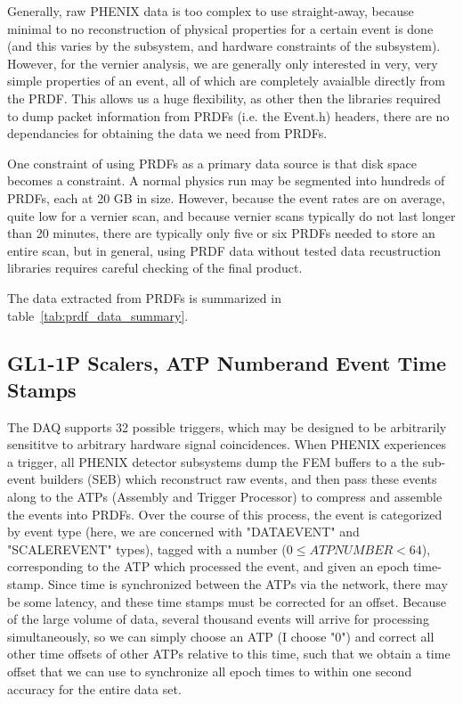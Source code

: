 Generally, raw PHENIX data is too complex to use straight-away, because minimal
to no reconstruction of physical properties for a certain event is done (and
this varies by the subsystem, and hardware constraints of the subsystem).
However, for the vernier analysis, we are generally only interested in very,
very simple properties of an event, all of which are completely avaialble
directly from the PRDF. This allows us a huge flexibility, as other then the
libraries required to dump packet information from PRDFs (i.e. the Event.h)
headers, there are no dependancies for obtaining the data we need from PRDFs.

One constraint of using PRDFs as a primary data source is that disk space
becomes a constraint. A normal physics run may be segmented into hundreds of
PRDFs, each at 20 GB in size. However, because the event rates are on average,
quite low for a vernier scan, and because vernier scans typically do not last
longer than 20 minutes, there are typically only five or six PRDFs needed to
store an entire scan, but in general, using PRDF data without tested data
recustruction libraries requires careful checking of the final product.

The data extracted from PRDFs is summarized in table~\ref{tab:prdf_data_summary}.


\subsection{GL1-1P Scalers, ATP Numberand Event Time Stamps}
The DAQ supports 32 possible triggers, which may be designed to be arbitrarily
sensititve to arbitrary hardware signal coincidences. When PHENIX experiences a
trigger, all PHENIX detector subsystems dump the FEM buffers to a the sub-event
builders (SEB) which reconstruct raw events, and then pass these events along to
the ATPs (Assembly and Trigger Processor) to compress and assemble the events
into PRDFs. Over the course of this process, the event is categorized by event
type (here, we are concerned with "DATAEVENT" and "SCALEREVENT" types), tagged
with a number ($0 \leq ATPNUMBER < 64$), corresponding to the ATP which
processed the event, and given an epoch time-stamp. Since time is synchronized
between the ATPs via the network, there may be some latency, and these time
stamps must be corrected for an offset.  Because of the large volume of data,
several thousand events will arrive for processing simultaneously, so we can
simply choose an ATP (I choose "0") and correct all other time offsets of other
ATPs relative to this time, such that we obtain a time offset that we can use to
synchronize all epoch times to within one second accuracy for the entire data
set.

